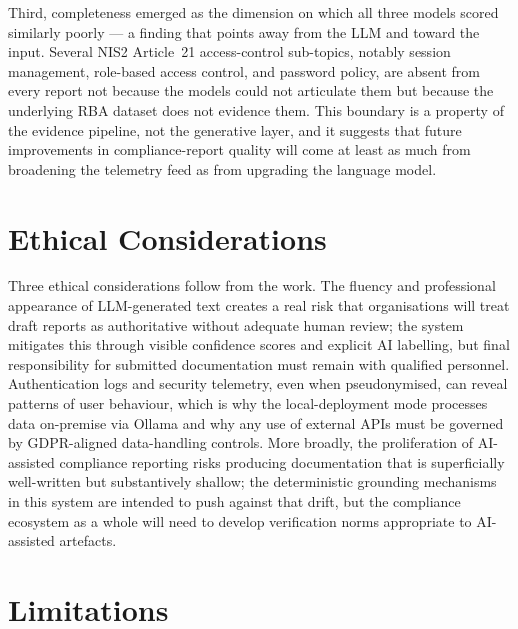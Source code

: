 \documentclass[]{UCD_CS_FYP_Report}
\begin{document}
Third, completeness emerged as the dimension on which all three models scored similarly poorly --- a finding that points away from the LLM and toward the input. Several NIS2 Article~21 access-control sub-topics, notably session management, role-based access control, and password policy, are absent from every report not because the models could not articulate them but because the underlying RBA dataset does not evidence them. This boundary is a property of the evidence pipeline, not the generative layer, and it suggests that future improvements in compliance-report quality will come at least as much from broadening the telemetry feed as from upgrading the language model.

\section{Ethical Considerations}
\label{sec:conclusion_ethics}

Three ethical considerations follow from the work. The fluency and professional appearance of LLM-generated text creates a real risk that organisations will treat draft reports as authoritative without adequate human review; the system mitigates this through visible confidence scores and explicit AI labelling, but final responsibility for submitted documentation must remain with qualified personnel. Authentication logs and security telemetry, even when pseudonymised, can reveal patterns of user behaviour, which is why the local-deployment mode processes data on-premise via Ollama and why any use of external APIs must be governed by GDPR-aligned data-handling controls\cite{GDPR2016}. More broadly, the proliferation of AI-assisted compliance reporting risks producing documentation that is superficially well-written but substantively shallow; the deterministic grounding mechanisms in this system are intended to push against that drift, but the compliance ecosystem as a whole will need to develop verification norms appropriate to AI-assisted artefacts.

\section{Limitations}
\label{sec:conclusion_limitations}
\end{document}
